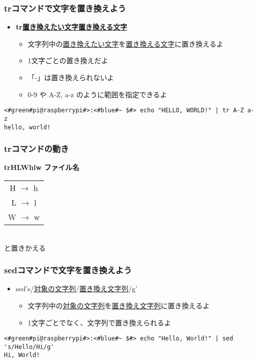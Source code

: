 \begin{frame}[fragile]
    \frametitle{trコマンドで文字を置き換えよう}
    \begin{itemize}
        \item {\bf tr\textvisiblespace\underline{置き換えたい文字}\textvisiblespace\underline{置き換える文字}}
        \begin{itemize}
            \small
            \item 文字列中の\underline{置き換えたい文字}を\underline{置き換える文字}に置き換えるよ
            \item 1文字ごとの置き換えだよ
            \item 「-」は置き換えられないよ
            \item 0-9 や A-Z, a-z のように範囲を指定できるよ
        \end{itemize}
    \end{itemize}
    \begin{lstlisting}[title=範囲指定を使った置き換え, label=tr_range]
<#green#pi@raspberrypi#>:<#blue#~ $#> echo "HELLO, WORLD!" | tr A-Z a-z
hello, world!
    \end{lstlisting}
\end{frame}

\begin{frame}
    \frametitle{trコマンドの動き}
    \begin{center}
        {\bf tr\textvisiblespace HLW\textvisiblespace hlw ファイル名}\\
        \vspace{\zh}
        \begin{tabular}{c}
        H $\rightarrow$ h \\
        L $\rightarrow$ l \\
        W $\rightarrow$ w \\ 
        \end{tabular}\\
        と置きかえる
    \end{center}
\end{frame}

\begin{frame}[fragile]
    \frametitle{sedコマンドで文字を置き換えよう}
    \begin{itemize}
        \item sed\textvisiblespace 's/\underline{対象の文字列}/\underline{置き換え文字列}/g'
        \begin{itemize}
            \small
            \item 文字列中の\underline{対象の文字列}を\underline{置き換え文字列}に置き換えるよ
            \item 1文字ごとでなく、文字列で置き換えられるよ
        \end{itemize}
    \end{itemize}
    \begin{lstlisting}[title=sedでの文字の置き換え, label=sed_app]
<#green#pi@raspberrypi#>:<#blue#~ $#> echo "Hello, World!" | sed 's/Hello/Hi/g'
Hi, World!
    \end{lstlisting}
\end{frame}


